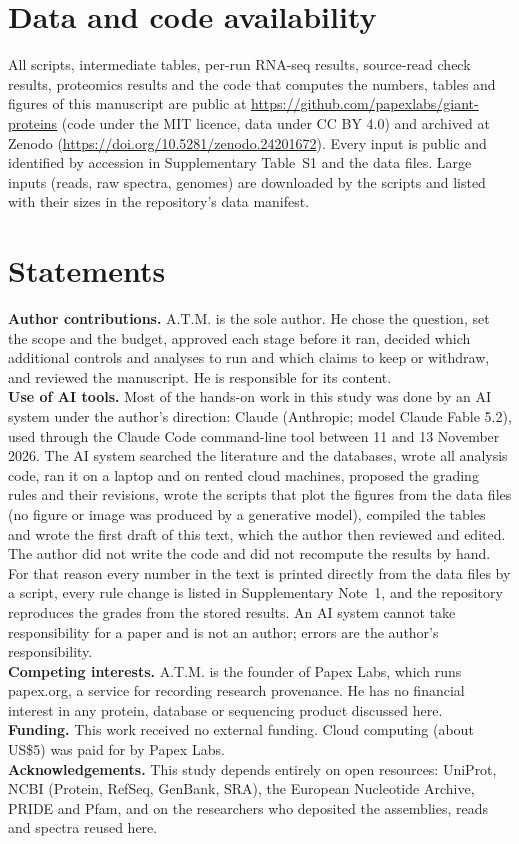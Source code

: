 \documentclass[11pt]{article}
\begin{document}
\section*{Data and code availability}
All scripts, intermediate tables, per-run RNA-seq results, source-read check results, proteomics results and the code
that computes the numbers, tables and figures of this manuscript are public at
\url{https://github.com/papexlabs/giant-proteins} (code under the MIT licence, data under CC BY 4.0) and archived at
Zenodo (\url{https://doi.org/10.5281/zenodo.24201672}). Every input is public and identified by accession in Supplementary Table~S1 and
the data files. Large inputs (reads, raw spectra, genomes) are downloaded by the scripts and listed with their sizes in
the repository's data manifest.

\section*{Statements}
\noindent\textbf{Author contributions.} A.T.M. is the sole author. He chose the question, set the scope and the
budget, approved each stage before it ran, decided which additional controls and analyses to run and which claims to
keep or withdraw, and reviewed the manuscript. He is responsible for its content.\\[4pt]
\textbf{Use of AI tools.} Most of the hands-on work in this study was done by an AI system under the author's
direction: Claude (Anthropic; model Claude Fable 5.2), used through the Claude Code command-line tool between 11 and
13 November 2026. The AI system searched the literature and the databases, wrote all analysis code, ran it on a
laptop and on rented cloud machines, proposed the grading rules and their revisions, wrote the scripts that plot the figures from the data files (no
figure or image was produced by a generative model), compiled the tables and wrote the first draft of this text, which the author then reviewed and edited. The author did not write
the code and did not recompute the results by hand. For that reason every number in the text is printed directly
from the data files by a script, every rule change is listed in Supplementary Note~1, and the repository reproduces
the grades from the stored results. An AI system cannot take responsibility for a paper and is not an author; errors
are the author's responsibility.\\[4pt]
\textbf{Competing interests.} A.T.M. is the founder of Papex Labs, which runs papex.org, a service for recording
research provenance. He has no financial interest in any protein, database or sequencing product discussed here.\\[4pt]
\textbf{Funding.} This work received no external funding. Cloud computing (about US\$5) was paid for by Papex
Labs.\\[4pt]
\textbf{Acknowledgements.} This study depends entirely on open resources: UniProt, NCBI (Protein, RefSeq, GenBank,
SRA), the European Nucleotide Archive, PRIDE and Pfam, and on the researchers who deposited the assemblies, reads and
spectra reused here.



\end{document}
